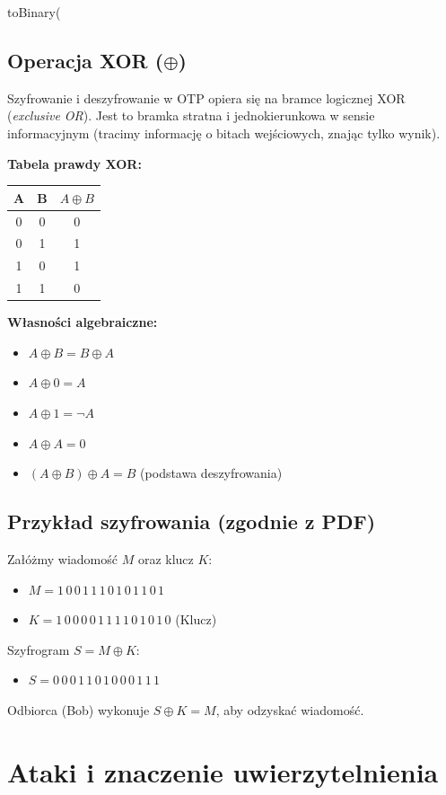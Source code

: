 toBinary(\documentclass{article}
\begin{document}
\subsection{Operacja XOR ($\oplus$)}
Szyfrowanie i deszyfrowanie w OTP opiera się na bramce logicznej XOR (\textit{exclusive OR}). Jest to bramka stratna i jednokierunkowa w sensie informacyjnym (tracimy informację o bitach wejściowych, znając tylko wynik).

\textbf{Tabela prawdy XOR:}
\begin{center}
\begin{tabular}{|c|c|c|}
\hline
A & B & $A \oplus B$ \\ \hline
0 & 0 & 0 \\ \hline
0 & 1 & 1 \\ \hline
1 & 0 & 1 \\ \hline
1 & 1 & 0 \\ \hline
\end{tabular}
\end{center}

\textbf{Własności algebraiczne:}
\begin{itemize}
    \item $A \oplus B = B \oplus A$
    \item $A \oplus 0 = A$
    \item $A \oplus 1 = \neg A$
    \item $A \oplus A = 0$
    \item $(A \oplus B) \oplus A = B$ (podstawa deszyfrowania)
\end{itemize}

\subsection{Przykład szyfrowania (zgodnie z PDF)}
Załóżmy wiadomość $M$ oraz klucz $K$:
\begin{itemize}
    \item[] $M = 1\,0\,0\,1\,1\,1\,0\,1\,0\,1\,1\,0\,1$
    \item[] $K = 1\,0\,0\,0\,0\,1\,1\,1\,1\,0\,1\,0\,1\,0$ (Klucz)
\end{itemize}
Szyfrogram $S = M \oplus K$:
\begin{itemize}
    \item[] $S = 0\,0\,0\,1\,1\,0\,1\,0\,0\,0\,1\,1\,1$
\end{itemize}
Odbiorca (Bob) wykonuje $S \oplus K = M$, aby odzyskać wiadomość.

\section{Ataki i znaczenie uwierzytelnienia}
\end{document}
